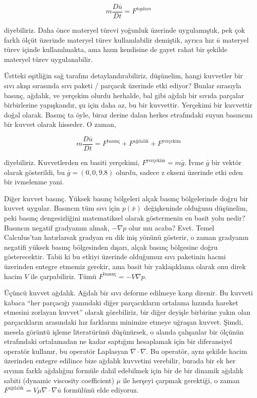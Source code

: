 \documentclass[12pt,fleqn]{article}\usepackage{../../common}
\begin{document}
$$
m \frac{D \bar{u}}{D t} = F^{toplam}
$$

diyebiliriz. Daha önce materyel türevi yoğunluk üzerinde uygulamıştık, pek çok
farklı ölçüt üzerinde materyel türev kullanılabilir demiştik, ayrıca hız
$\bar{u}$ materyel türev içinde kullanılmakta, ama hızın kendisine de gayet
rahat bir şekilde materyel türev uygulanabilir.

Üstteki eşitliğin sağ tarafını detaylandırabiliriz, düşünelim, hangi kuvvetler
bir sıvı akışı sırasında sıvı paketi / parçacık üzerinde etki ediyor? Bunlar
sırasıyla basınç, ağdalık, ve yerçekim olurdu herhalde, bal gibi ağdalı bir
sıvıda parçalar birbirlerine yapışkandır, şu için daha az, bu bir
kuvvettir. Yerçekimi bir kuvvettir doğal olarak. Basınç ta öyle, biraz derine
dalan herkes etrafındaki suyun basıncını bir kuvvet olarak hisseder. O zaman,

$$
m \frac{D \bar{u}}{D t} = F^{\textrm{basınç}} + F^{\textrm{ağdalık}} + F^{\textrm{yerçekim}} 
$$

diyebiliriz. Kuvvetlerden en basiti yerçekimi, $F^{\textrm{yerçekim}} = m
\bar{g}$. İvme $\bar{g}$ bir vektör olarak gösterildi, bu $\bar{g} = (0, 0,
9.8)$ olurdu, sadece z ekseni üzerinde etki eden bir ivmelenme yani.

Diğer kuvvet basınç. Yüksek basınç bölgeleri alçak basınç bölgelerinde doğru bir
kuvvet uygular. Basıncın tüm sıvı için $p(\bar{x})$ değişkeninde olduğunu
düşünelim, peki basınç dengesizliğini matematiksel olarak göstermenin en basit
yolu nedir? Basıncın negatif gradyanını almak, $-\nabla p$ olur mu acaba?
Evet. Temel Calculus'tan hatırlarsak gradyan en dik iniş yönünü gösterir, o
zaman gradyanın negatifi yüksek basınç bölgesinden dışarı, alçak basınç
bölgesine doğru gösterecektir. Tabii ki bu etkiyi üzerinde olduğumuz sıvı
paketinin hacmi üzerinden entegre etmemiz gerekir, ama basit bir yaklaşıklama
olarak onu direk hacim $V$ ile çarpabiliriz. Tümü $F^{\textrm{basınç}} = - V
\nabla p$.

Üçüncü kuvvet ağdalık. Ağdalı bir sıvı deforme edilmeye karşı direnir. Bu
kuvveti kabaca ``her parçacığı yanındaki diğer parçacıkların ortalama hızında
hareket etmesini zorlayan kuvvet'' olarak görebiliriz, bir diğer deyişle
birbirine yakın olan parçacıkların arasındaki hız farklarını minimize etmeye
uğraşan kuvvet. Şimdi, mesela görüntü işleme literatürünü düşünürsek, o alanda
çalışanlar bir ölçünün etrafındaki ortalamadan ne kadar saptığını hesaplamak
için bir diferansiyel operatör kullanır, bu operatör Laplasyan $\nabla \cdot
\nabla$.  Bu operatör, aynı şekilde hacim üzerinden entegre edilince bize
ağdalık kuvvetini verebilir, burada bir ek her sıvının farklı ağdalığını formüle
dahil edebilmek için bir de bir dinamik ağdalık sabiti (dynamic viscosity
coefficient) $\mu$ ile herşeyi çarpmak gerektiği, o zaman $F^{\textrm{ağdalık}}
= V \mu \nabla \cdot \nabla \bar{u}$ formülünü elde ediyoruz.
\end{document}

